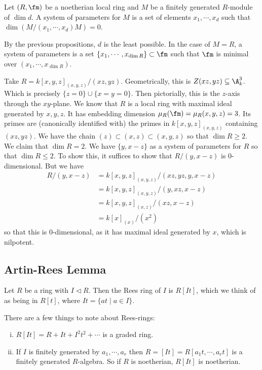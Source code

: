 \begin{dfn}
Let $(R,\fm)$ be a noetherian local ring and $M$ be a finitely generated $R$-module of $\dim d$. A system of parameters for $M$ is a set of elements $x_1,\cdots,x_d$ such that $\dim(M/(x_1,\cdots,x_d)M)=0$. 
\end{dfn}

By the previous propositions, $d$ is the least possible. In the case of $M=R$, a system of parameters is a set $\{x_1,\cdots,x_{\dim R}\} \subset \fm$ such that $\fm$ is minimal over $(x_1,\cdots,x_{\dim R})$. 

\begin{ex}
Take $R=k[x,y,z]_{(x,y,z)}/(xz,yz)$. Geometrically, this is $Z(xz,yz) \subseteq \A^3_k$. Which is precisely $\{z=0\} \cup \{x=y=0\}$. Then pictorially, this is the $z$-axis through the $xy$-plane. We know that $R$ is a local ring with maximal ideal generated by $x,y,z$. It has embedding dimension $\mu_R(\fm)=\mu_R(x,y,z)=3$. Its primes are (canonically identified with) the primes in $k[x,y,z]_{(x,y,z)}$ containing $(xz,yz)$. We have the chain $(z) \subset (x,z) \subset (x,y,z)$ so that $\dim R \geq 2$. We claim that $\dim R=2$. We have $\{y,x-z\}$ as a system of parameters for $R$ so that $\dim R \leq 2$. To show this, it suffices to show that $R/(y,x-z)$ is 0-dimensional. But we have
\[
\begin{split}
R/(y,x-z)&=k[x,y,z]_{(x,y,z)}/(xz,yz,y,x-z) \\
&=k[x,y,z]_{(x,y,z)}/(y,xz,x-z) \\
&=k[x,y,z]_{(x,z)}/(xz,x-z) \\
&=k[x]_{(x)}/(x^2)
\end{split}
\]
so that this is 0-dimensional, as it has maximal ideal generated by $x$, which is nilpotent. 
\end{ex}

\subsection{Artin-Rees Lemma}

\begin{dfn}
Let $R$ be a ring with $I \lhd R$. Then the Rees ring of $I$ is $R[It]$, which we think of as being in $R[t]$, where $It=\{at \;|\; a \in I\}$. 
\end{dfn}

\begin{rem}
There are a few things to note about Rees-rings:
\begin{enumerate}[(i)]
\item $R[It]=R+It+I^2t^2+\cdots$ is a graded ring.
\item If $I$ is finitely generated by $a_1,\cdots,a_r$ then $R=[It]=R[a_1t,\cdots,a_rt]$ is a finitely generated $R$-algebra. So if $R$ is noetherian, $R[It]$ is noetherian. 
\end{enumerate}
\end{rem}

